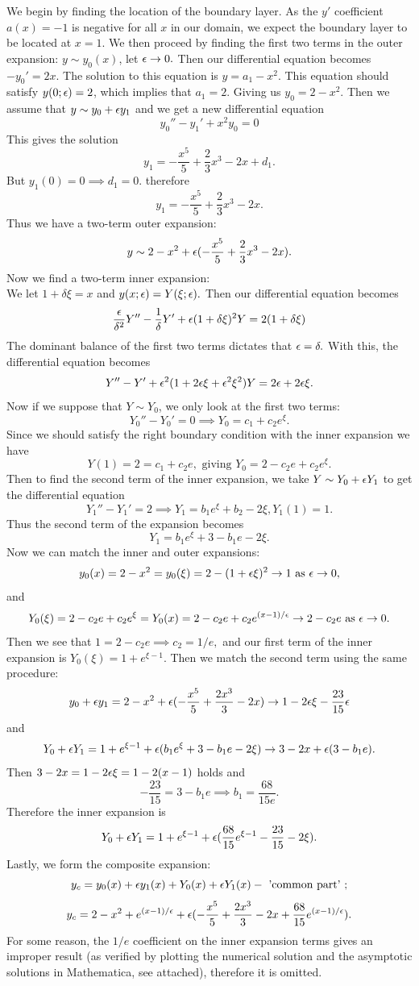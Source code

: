     We begin by finding the location of the boundary layer. As the $y'$ coefficient $a(x)=-1$ is negative for all $x$ in our domain, we expect the boundary layer to be located at $x=1.$ We then proceed by finding the first two terms in the outer expansion: $y\sim y_0(x)$, let $\epsilon\to 0.$ Then our differential equation becomes
    $-y_0'=2x.$ The solution to this equation is $y=a_1-x^2.$ This equation should satisfy $y(0;\epsilon)=2$, which implies that $a_1=2.$ Giving us $y_0=2-x^2.$ Then we assume that $y\sim y_0+\epsilon y_1$ and we get a new differential equation
    $$y_0''-y_1'+x^2y_0=0$$ This gives the solution
    $$y_1=-\frac{x^5}{5}+\frac{2}{3}x^3-2x+d_1.$$
    But $y_1(0)=0\implies d_1=0.$ therefore
    $$y_1=-\frac{x^5}{5}+\frac{2}{3}x^3-2x.$$
    Thus we have a two-term outer expansion:
    $$y\sim 2-x^2+\epsilon(-\frac{x^5}{5}+\frac{2}{3}x^3-2x).$$
    Now we find a two-term inner expansion:\\
    We let $1+\delta \xi=x$ and $y(x;\epsilon)=Y(\xi;\epsilon).$ Then our differential equation becomes
    $$\frac{\epsilon}{\delta^2}Y''-\frac{1}{\delta}Y'+\epsilon(1+\delta\xi)^2Y=2(1+\delta\xi)$$
    The dominant balance of the first two terms dictates that $\epsilon=\delta.$ With this, the differential equation becomes
    $$Y''-Y'+\epsilon^2(1+2\epsilon\xi+\epsilon^2\xi^2)Y=2\epsilon+2\epsilon\xi.$$
    Now if we suppose that $Y\sim Y_0$, we only look at the first two terms:
    $$Y_0''-Y_0'=0\implies Y_0=c_1+c_2e^\xi.$$
    Since we should satisfy the right boundary condition with the inner expansion we have
    $$Y(1)=2=c_1+c_2e, \text{ giving }Y_0=2-c_2e+c_2e^\xi.$$
    Then to find the second term of the inner expansion, we take $Y\sim Y_0+\epsilon Y_1$ to get the differential equation
    $$Y_1''-Y_1'=2\implies Y_1=b_1e^\xi+b_2-2\xi, Y_1(1)=1.$$
    Thus the second term of the expansion becomes
    $$Y_1=b_1e^\xi+3-b_1 e-2\xi.$$
    Now we can match the inner and outer expansions:
    $$y_0(x)=2-x^2=y_0(\xi)=2-(1+\epsilon\xi)^2\to 1 \text{ as } \epsilon\to 0,$$
    and
    $$Y_0(\xi)=2-c_2e+c_2e^\xi=Y_0(x)=2-c_2e+c_2e^{(x-1)/\epsilon}\to 2-c_2 e\text{ as }\epsilon\to 0.$$
    Then we see that $1=2-c_2e\implies c_2=1/e,$ and our first term of the inner expansion is $Y_0(\xi)=1+e^{\xi-1}$. Then we match the second term using the same procedure:
    $$y_0+\epsilon y_1=2-x^2+\epsilon(-\frac{x^5}{5}+\frac{2x^3}{3}-2x)\to 1-2\epsilon\xi-\frac{23}{15}\epsilon$$
    and
    $$Y_0+\epsilon Y_1=1+e^{\xi-1}+\epsilon(b_1e^\xi+3-b_1 e-2\xi)\to 3-2x+\epsilon(3-b_1e).$$
    Then $3-2x=1-2\epsilon\xi=1-2(x-1)$ holds and
    $$-\frac{23}{15}=3-b_1 e\implies b_1=\frac{68}{15 e}.$$
    Therefore the inner expansion is
    $$Y_0+\epsilon Y_1=1+e^{\xi-1}+\epsilon(\frac{68}{15}e^{\xi-1}-\frac{23}{15}-2\xi).$$
    Lastly, we form the composite expansion:
    $$y_c=y_0(x)+\epsilon y_1(x)+Y_0(x)+\epsilon Y_1(x)-\text{ 'common part' };$$
    $$y_c=2-x^2+e^{(x-1)/\epsilon}+\epsilon(-\frac{x^5}{5}+\frac{2x^3}{3}-2x+\frac{68}{15}e^{(x-1)/\epsilon}).$$
    For some reason, the $1/e$ coefficient on the inner expansion terms gives an improper result (as verified by plotting the numerical solution and the asymptotic solutions in Mathematica, see attached), therefore it is omitted.


